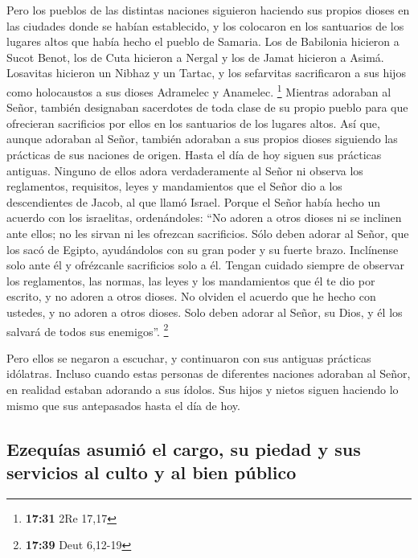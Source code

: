  Pero los pueblos de las distintas naciones siguieron
haciendo sus propios dioses en las ciudades donde se habían establecido,
y los colocaron en los santuarios de los lugares altos que había hecho
el pueblo de Samaria.  Los de Babilonia hicieron a Sucot
Benot, los de Cuta hicieron a Nergal y los de Jamat hicieron a Asimá.
 Losavitas hicieron un Nibhaz y un Tartac, y los
sefarvitas sacrificaron a sus hijos como holocaustos a sus dioses
Adramelec y Anamelec. \footnote{\textbf{17:31} 2Re 17,17}
 Mientras adoraban al Señor, también designaban
sacerdotes de toda clase de su propio pueblo para que ofrecieran
sacrificios por ellos en los santuarios de los lugares altos.
 Así que, aunque adoraban al Señor, también adoraban a
sus propios dioses siguiendo las prácticas de sus naciones de origen.
 Hasta el día de hoy siguen sus prácticas antiguas.
Ninguno de ellos adora verdaderamente al Señor ni observa los
reglamentos, requisitos, leyes y mandamientos que el Señor dio a los
descendientes de Jacob, al que llamó Israel.  Porque el
Señor había hecho un acuerdo con los israelitas, ordenándoles: ``No
adoren a otros dioses ni se inclinen ante ellos; no les sirvan ni les
ofrezcan sacrificios.  Sólo deben adorar al Señor, que
los sacó de Egipto, ayudándolos con su gran poder y su fuerte brazo.
Inclínense solo ante él y ofrézcanle sacrificios solo a él.
 Tengan cuidado siempre de observar los reglamentos, las
normas, las leyes y los mandamientos que él te dio por escrito, y no
adoren a otros dioses.  No olviden el acuerdo que he
hecho con ustedes, y no adoren a otros dioses.  Solo
deben adorar al Señor, su Dios, y él los salvará de todos sus
enemigos''. \footnote{\textbf{17:39} Deut 6,12-19}

 Pero ellos se negaron a escuchar, y continuaron con sus
antiguas prácticas idólatras.  Incluso cuando estas
personas de diferentes naciones adoraban al Señor, en realidad estaban
adorando a sus ídolos. Sus hijos y nietos siguen haciendo lo mismo que
sus antepasados hasta el día de hoy.

\hypertarget{ezequuxedas-asumiuxf3-el-cargo-su-piedad-y-sus-servicios-al-culto-y-al-bien-puxfablico}{%
\subsection{Ezequías asumió el cargo, su piedad y sus servicios al culto
y al bien
público}\label{ezequuxedas-asumiuxf3-el-cargo-su-piedad-y-sus-servicios-al-culto-y-al-bien-puxfablico}}

